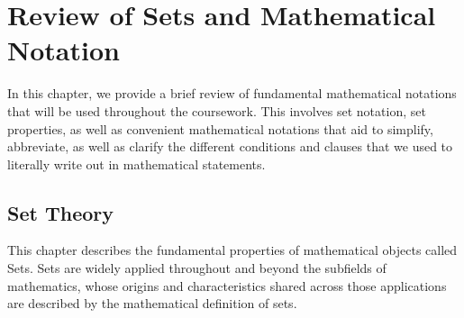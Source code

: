 \chapter{Review of Sets and Mathematical Notation}
In this chapter, we provide a brief review of fundamental mathematical notations that will be used throughout the coursework. This involves set notation, set properties, as well as convenient mathematical notations that aid to simplify, abbreviate, as well as clarify the different conditions and clauses that we used to literally write out in mathematical statements.

\section{Set Theory}
This chapter describes the fundamental properties of mathematical objects called Sets. Sets are widely applied throughout and beyond the subfields of mathematics, whose origins and characteristics shared across those applications are described by the mathematical definition of sets.


